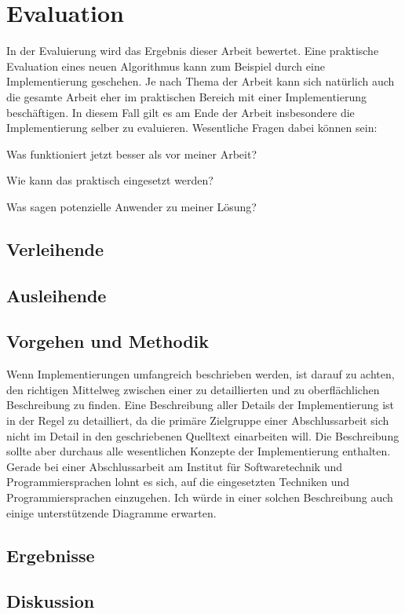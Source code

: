 
\chapter{Evaluation}
\label{chapter-evaluation}

In der Evaluierung wird das Ergebnis dieser Arbeit bewertet. Eine praktische Evaluation eines neuen Algorithmus kann zum Beispiel durch eine Implementierung geschehen. Je nach Thema der Arbeit kann sich natürlich auch die gesamte Arbeit eher im praktischen Bereich mit einer Implementierung beschäftigen. In diesem Fall gilt es am Ende der Arbeit insbesondere die Implementierung selber zu evaluieren. Wesentliche Fragen dabei können sein:
\begin{compactitem}[--]
  \item Was funktioniert jetzt besser als vor meiner Arbeit?
  \item Wie kann das praktisch eingesetzt werden?
  \item Was sagen potenzielle Anwender zu meiner Lösung?
\end{compactitem}

\section{Verleihende}

\section{Ausleihende}


\section{Vorgehen und Methodik}

Wenn Implementierungen umfangreich beschrieben werden, ist darauf zu achten, den richtigen Mittelweg zwischen einer zu detaillierten und zu oberflächlichen Beschreibung zu finden. Eine Beschreibung aller Details der Implementierung ist in der Regel zu detailliert, da die primäre Zielgruppe einer Abschlussarbeit sich nicht im Detail in den geschriebenen Quelltext einarbeiten will. Die Beschreibung sollte aber durchaus alle wesentlichen Konzepte der Implementierung enthalten. Gerade bei einer Abschlussarbeit am Institut für Softwaretechnik und Programmiersprachen lohnt es sich, auf die eingesetzten Techniken und Programmiersprachen einzugehen. Ich würde in einer solchen Beschreibung auch einige unterstützende Diagramme erwarten.

\section{Ergebnisse}

\section{Diskussion}